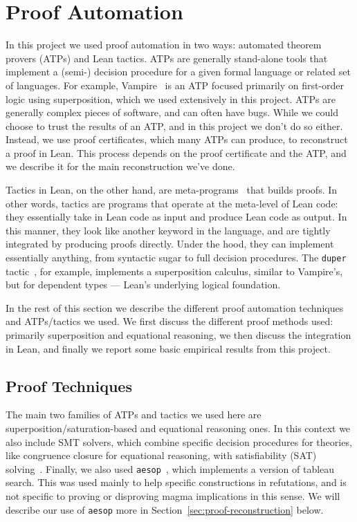 \section{Proof Automation}\label{automated-sec}

In this project we used proof automation in two ways: automated theorem provers (ATPs) and Lean tactics.
ATPs are generally stand-alone tools that implement a (semi-) decision procedure for a given formal language or related set of languages.
For example, Vampire~\cite{DBLP:conf/cav/KovacsV13} is an ATP focused primarily on first-order logic using superposition, which we used extensively in this project.
ATPs are generally complex pieces of software, and can often have bugs.
While we could choose to trust the results of an ATP, and in this project we don't do so either.
Instead, we use proof certificates, which many ATPs can produce, to reconstruct a proof in Lean.
This process depends on the proof certificate and the ATP, and we describe it for the main reconstruction we've done.

Tactics in Lean, on the other hand, are meta-programs~\cite{DBLP:journals/pacmpl/EbnerURAM17} that builds proofs.
In other words, tactics are programs that operate at the meta-level of Lean code: they essentially take in Lean code as input and produce Lean code as output.
In this manner, they look like another keyword in the language, and are tightly integrated by producing proofs directly.
Under the hood, they can implement essentially anything, from syntactic sugar to full decision procedures.
The \texttt{duper} tactic~\cite{DBLP:conf/itp/CluneQBA24}, for example, implements a superposition calculus, similar to Vampire's, but for dependent types --- Lean's underlying logical foundation.

In the rest of this section we describe the different proof automation techniques and ATPs/tactics we used.
We first discuss the different proof methods used: primarily superposition and equational reasoning, we then discuss the integration in Lean, and finally we report some basic empirical results from this project.

\subsection{Proof Techniques}

The main two families of ATPs and tactics we used here are superposition/saturation-based and equational reasoning ones.
In this context we also include SMT solvers, which combine specific decision procedures for theories, like congruence closure for equational reasoning, with satisfiability (SAT) solving~\cite{}.
Finally, we also used \texttt{aesop}~\cite{DBLP:conf/cpp/LimpergF23}, which implements a version of tableau search.
This was used mainly to help specific constructions in refutations, and is not specific to proving or disproving magma implications in this sense.
We will describe our use of \texttt{aesop} more in Section~\ref{sec:proof-reconstruction} below.

